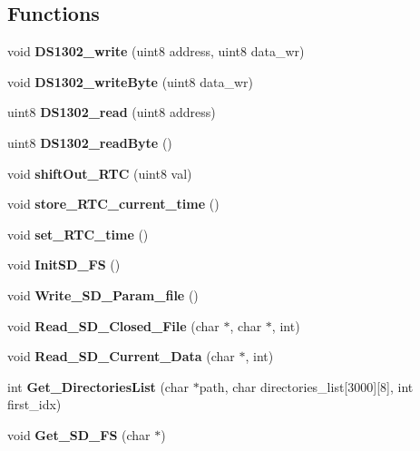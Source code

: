 \subsection*{Functions}
\begin{DoxyCompactItemize}
\item 
\mbox{\label{_s_d___r_t_c__functions_8h_ae916e48139e2369b4295bc32b754cb09}} 
void {\bfseries D\+S1302\+\_\+write} (uint8 address, uint8 data\+\_\+wr)
\item 
\mbox{\label{_s_d___r_t_c__functions_8h_abf7dafb7cb2decd885c06cfd0d508a86}} 
void {\bfseries D\+S1302\+\_\+write\+Byte} (uint8 data\+\_\+wr)
\item 
\mbox{\label{_s_d___r_t_c__functions_8h_a648ecf3d4f3a92e6390945b156d5c98a}} 
uint8 {\bfseries D\+S1302\+\_\+read} (uint8 address)
\item 
\mbox{\label{_s_d___r_t_c__functions_8h_a961280caa20d802239a974419c19437e}} 
uint8 {\bfseries D\+S1302\+\_\+read\+Byte} ()
\item 
\mbox{\label{_s_d___r_t_c__functions_8h_a1f5533e91998b92926173f479322c7d9}} 
void {\bfseries shift\+Out\+\_\+\+R\+TC} (uint8 val)
\item 
\mbox{\label{_s_d___r_t_c__functions_8h_a262170705e582875a383a9f5c9b137a7}} 
void {\bfseries store\+\_\+\+R\+T\+C\+\_\+current\+\_\+time} ()
\item 
\mbox{\label{_s_d___r_t_c__functions_8h_ad0181162f59bf423c6d1dc1556afb6fc}} 
void {\bfseries set\+\_\+\+R\+T\+C\+\_\+time} ()
\item 
\mbox{\label{_s_d___r_t_c__functions_8h_a56466454f41dc875787a75f0d78b5602}} 
void {\bfseries Init\+S\+D\+\_\+\+FS} ()
\item 
\mbox{\label{_s_d___r_t_c__functions_8h_a5072914b0c92c6825bb196ba84b332c4}} 
void {\bfseries Write\+\_\+\+S\+D\+\_\+\+Param\+\_\+file} ()
\item 
\mbox{\label{_s_d___r_t_c__functions_8h_aba7e3006e26119efb8f8764b27fd31fa}} 
void {\bfseries Read\+\_\+\+S\+D\+\_\+\+Closed\+\_\+\+File} (char $\ast$, char $\ast$, int)
\item 
\mbox{\label{_s_d___r_t_c__functions_8h_abe0b3f7e7bb802a235c504c143bdad3f}} 
void {\bfseries Read\+\_\+\+S\+D\+\_\+\+Current\+\_\+\+Data} (char $\ast$, int)
\item 
\mbox{\label{_s_d___r_t_c__functions_8h_ac3a7b606d29e076ac0b4fa78b46a56a1}} 
int {\bfseries Get\+\_\+\+Directories\+List} (char $\ast$path, char directories\+\_\+list[3000][8], int first\+\_\+idx)
\item 
\mbox{\label{_s_d___r_t_c__functions_8h_abdf9196d903441c0febde4aa4d82f91f}} 
void {\bfseries Get\+\_\+\+S\+D\+\_\+\+FS} (char $\ast$)
\end{DoxyCompactItemize}


